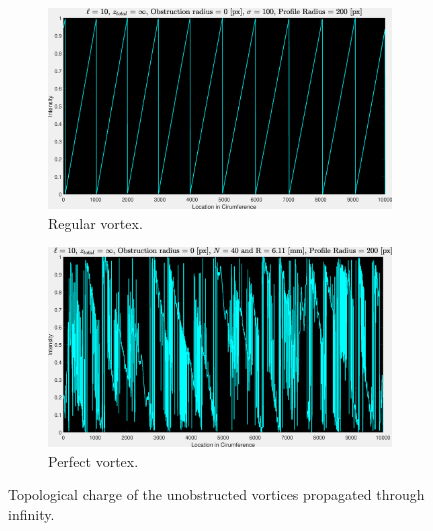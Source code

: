 \begin{figure}[htbp]
    \centering
    \begin{subfigure}[b]{0.45\textwidth}
        \centering
        \includegraphics[width=\textwidth]{images/c04/type=0_r=0_zi=0_zf=Inf_TC.eps}
        \caption{Regular vortex.}
    \end{subfigure}
    \hfill
    \begin{subfigure}[b]{0.45\textwidth}
        \centering
        \includegraphics[width=\textwidth]{images/c04/type=1_r=0_zi=0_zf=Inf_TC.eps}
        \caption{Perfect vortex.}
    \end{subfigure}
    \caption{Topological charge of the unobstructed vortices propagated through infinity.}
    \label{fig:Vortices_r=0_z=inf_TC}
\end{figure}


